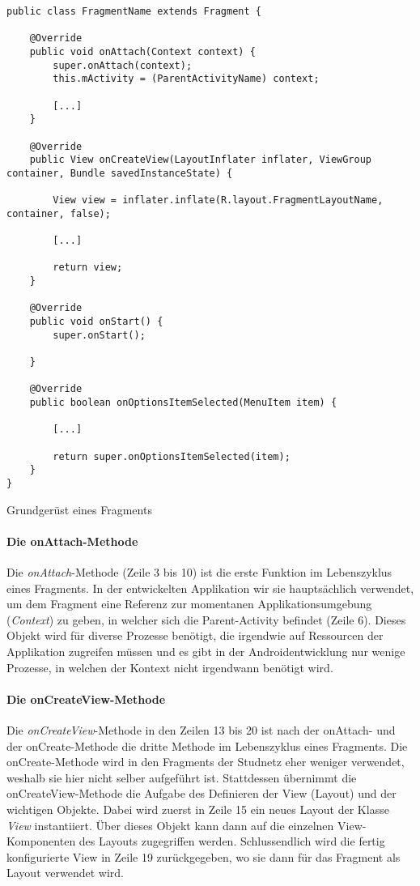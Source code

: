 \documentclass[../main.tex]{subfiles}
\begin{document}
	\begin{code}
		\begin{center}
			\begin{verbatim}
public class FragmentName extends Fragment {
			
	@Override
	public void onAttach(Context context) {
		super.onAttach(context);
		this.mActivity = (ParentActivityName) context;
		
		[...]
	}
	
	@Override
	public View onCreateView(LayoutInflater inflater, ViewGroup container, Bundle savedInstanceState) {
	
		View view = inflater.inflate(R.layout.FragmentLayoutName, container, false);

		[...]

		return view;
	}
			
	@Override
	public void onStart() {
		super.onStart();
	
	}
			
	@Override
	public boolean onOptionsItemSelected(MenuItem item) {
			
		[...]
			
		return super.onOptionsItemSelected(item);
	}
}	
			\end{verbatim}
		\end{center}
		\caption{Grundgerüst eines Fragments} \label{fragmentStructure}
	\end{code}

	\paragraph{Die onAttach-Methode}
	Die \emph{onAttach}-Methode (Zeile 3 bis 10) ist die erste Funktion im Lebenszyklus eines Fragments. In der entwickelten Applikation wir sie hauptsächlich verwendet, um dem Fragment eine Referenz zur momentanen Applikationsumgebung (\emph{Context}) zu geben, in welcher sich die Parent-Activity befindet (Zeile 6). Dieses Objekt wird für diverse Prozesse benötigt, die irgendwie auf Ressourcen der Applikation zugreifen müssen und es gibt in der Androidentwicklung nur wenige Prozesse, in welchen der Kontext nicht irgendwann benötigt wird. \cite{context}
	
	\paragraph{Die onCreateView-Methode}
	Die \emph{onCreateView}-Methode in den Zeilen 13 bis 20 ist nach der onAttach- und der onCreate-Methode die dritte Methode im Lebenszyklus eines Fragments. Die onCreate-Methode wird in den Fragments der Studnetz eher weniger verwendet, weshalb sie hier nicht selber aufgeführt ist. Stattdessen übernimmt die onCreateView-Methode die Aufgabe des Definieren der View (Layout) und der wichtigen Objekte. Dabei wird zuerst in Zeile 15 ein neues Layout der Klasse \emph{View} instantiiert. Über dieses Objekt kann dann auf die einzelnen View-Komponenten des Layouts zugegriffen werden. Schlussendlich wird die fertig konfigurierte View in Zeile 19 zurückgegeben, wo sie dann für das Fragment als Layout verwendet wird.
	
\end{document}
